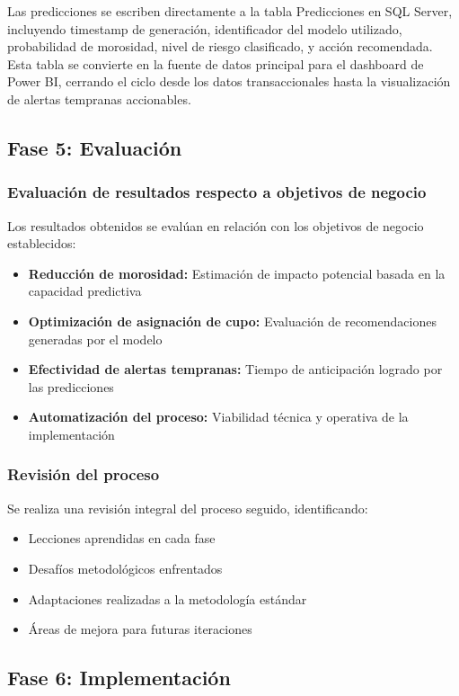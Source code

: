 Las predicciones se escriben directamente a la tabla Predicciones en SQL Server, incluyendo timestamp de generación, identificador del modelo utilizado, probabilidad de morosidad, nivel de riesgo clasificado, y acción recomendada. Esta tabla se convierte en la fuente de datos principal para el dashboard de Power BI, cerrando el ciclo desde los datos transaccionales hasta la visualización de alertas tempranas accionables.

\subsection{Fase 5: Evaluación}
\subsubsection{Evaluación de resultados respecto a objetivos de negocio}
Los resultados obtenidos se evalúan en relación con los objetivos de negocio establecidos:

\begin{itemize}
    \item \textbf{Reducción de morosidad:} Estimación de impacto potencial basada en la capacidad predictiva
    \item \textbf{Optimización de asignación de cupo:} Evaluación de recomendaciones generadas por el modelo
    \item \textbf{Efectividad de alertas tempranas:} Tiempo de anticipación logrado por las predicciones
    \item \textbf{Automatización del proceso:} Viabilidad técnica y operativa de la implementación
\end{itemize}

\subsubsection{Revisión del proceso}
Se realiza una revisión integral del proceso seguido, identificando:

\begin{itemize}
    \item Lecciones aprendidas en cada fase
    \item Desafíos metodológicos enfrentados
    \item Adaptaciones realizadas a la metodología estándar
    \item Áreas de mejora para futuras iteraciones
\end{itemize}

\subsection{Fase 6: Implementación}
